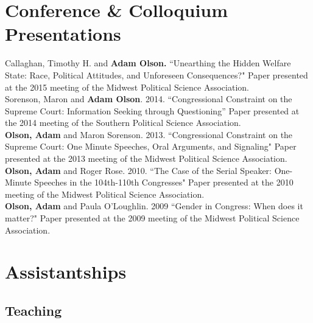 \documentclass[12pt,roman, letter]{moderncv}
\begin{document}
\section{Conference \& Colloquium Presentations}
Callaghan, Timothy H. and \textbf{Adam Olson.} ``Unearthing the Hidden Welfare State: Race, Political Attitudes, and Unforeseen Consequences?" Paper presented at the 2015 meeting of the Midwest Political Science Association.\\

Sorenson, Maron and \textbf{Adam Olson}. 2014. ``Congressional Constraint on the Supreme Court: Information Seeking through Questioning'' Paper presented at the 2014 meeting of the Southern Political Science Association.\\

\textbf{Olson, Adam} and Maron Sorenson. 2013. ``Congressional Constraint on the Supreme Court: One Minute Speeches, Oral Arguments, and Signaling" Paper presented at the 2013 meeting of the Midwest Political Science Association.\\

\textbf{Olson, Adam} and Roger Rose. 2010. ``The Case of the Serial Speaker: One-Minute Speeches in the 104th-110th Congresses" Paper presented at the 2010 meeting of the Midwest Political Science Association.\\

\textbf{Olson, Adam} and Paula O'Loughlin. 2009 ``Gender in Congress: When does it matter?" Paper presented at the 2009 meeting of the Midwest Political Science Association.

\section{Assistantships}
\subsection{Teaching}
\end{document}
